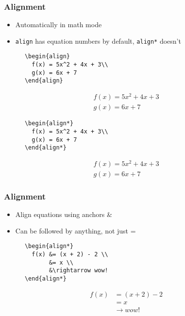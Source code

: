 \documentclass{beamer}
\begin{document}
\begin{frame}[fragile]
  \frametitle{Alignment}
  \begin{itemize}
    \item Automatically in math mode
    \item \verb.align. has equation numbers by default, \verb.align*. doesn't
  \end{itemize}
  \begin{multicols}{2}
    \begin{verbatim}
      \begin{align}
        f(x) = 5x^2 + 4x + 3\\
        g(x) = 6x + 7
      \end{align}
    \end{verbatim}
  \columnbreak
    \begin{align}
      f(x) = 5x^2 + 4x + 3\\
      g(x) = 6x + 7
    \end{align}
  \end{multicols}

  \begin{multicols}{2}
    \begin{verbatim}
      \begin{align*}
        f(x) = 5x^2 + 4x + 3\\
        g(x) = 6x + 7
      \end{align*}
    \end{verbatim}
  \columnbreak
    \begin{align*}
      f(x) = 5x^2 + 4x + 3\\
      g(x) = 6x + 7
    \end{align*}
  \end{multicols}
\end{frame}

\begin{frame}[fragile]
	\frametitle{Alignment}
  \begin{itemize}
    \item Align equations using anchors \&
    \item Can be followed by anything, not just =
  \end{itemize}
  \begin{multicols}{2}
    \begin{verbatim}
      \begin{align*}
        f(x) &= (x + 2) - 2 \\
             &= x \\
             &\rightarrow wow!
      \end{align*}
    \end{verbatim}
  \columnbreak
    \begin{align*}
      f(x) &= (x + 2) - 2\\
           &= x \\
           &\rightarrow wow!
    \end{align*}
  \end{multicols}
\end{frame}
\end{document}
